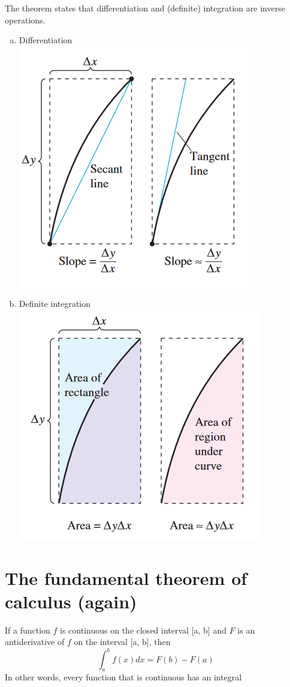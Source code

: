 \documentclass[11pt]{article}
\begin{document}
The theorem states that differentiation and (definite) integration are inverse operations.
\begin{enumerate}[(a)]
    \item Differentiation\\ \includegraphics{diff.png}\\
    \item Definite integration\\ \includegraphics{int.png}
\end{enumerate}

\section{The fundamental theorem of calculus (again)}
If a function $f$ is continuous on the closed interval [a, b] and $F$ is an antiderivative of $f$ on the interval [a, b], then
\[\int_{a}^{b}f(x)dx=F(b)-F(a)\]
In other words, every function that is continuous has an integral
\end{document}
